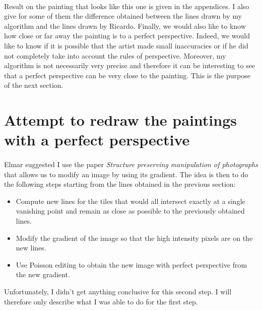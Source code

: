 \documentclass[11pt]{article}
\begin{document}
	\paragraph{}
	Result on the painting that looks like this one is given in the appendices. I also give for some of them the difference obtained between the lines drawn by my algorithm and the lines drawn by Ricardo.	Finally, we would also like to know how close or far away the painting is to a perfect perspective. Indeed, we would like to know if it is possible that the artist made small inaccuracies or if he did not completely take into account the rules of perspective. Moreover, my algorithm is not necessarily very precise and therefore it can be interesting to see that a perfect perspective can be very close to the painting. This is the purpose of the next section. 

	\section{Attempt to redraw the paintings with a perfect perspective}
	
	\label{s:redraw}
	
	\paragraph{}
	Elmar suggested I use the paper \textit{Structure preserving manipulation of photographs} \cite{redraw} that allows us to modify an image by using its gradient. The idea is then to do the following steps starting from the lines obtained in the previous section:
	\begin{itemize}
		\item Compute new lines for the tiles that would all intersect exactly at a single vanishing point and remain as close as possible to the previously obtained lines.
		\item Modify the gradient of the image so that the high intensity pixels are on the new lines.
		\item Use Poisson editing \cite{poisson} to obtain the new image with perfect perspective from the new gradient.
	\end{itemize}
	Unfortunately, I didn't get anything conclusive for this second step. I will therefore only describe what I was able to do for the first step.
	
\end{document}
